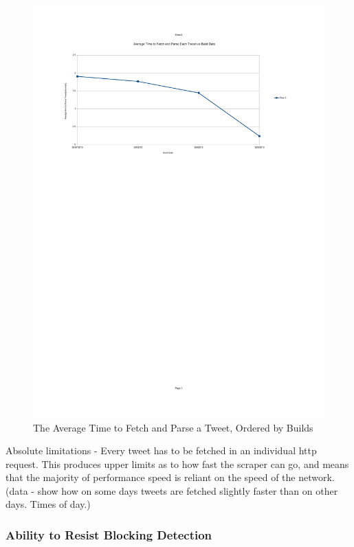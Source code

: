 \begin{figure}[h!]
\centering
\includegraphics{Images/average_time_to_fetch_parse_tweets_per_build.pdf}
\caption{The Average Time to Fetch and Parse a Tweet, Ordered by Builds}
\end{figure}

Absolute limitations - Every tweet has to be fetched in an individual http request. This produces upper limits as to how fast the scraper can go, and means that the majority of performance speed is reliant on the speed of the network. (data - show how on some days tweets are fetched slightly faster than on other days. Times of day.)

\subsubsection{Ability to Resist Blocking Detection}

